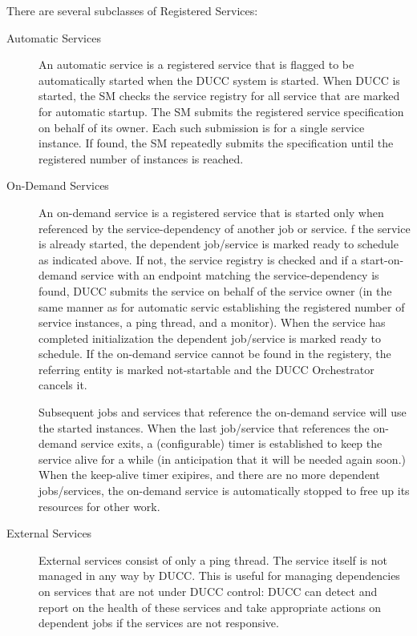       There are several subclasses of Registered Services:
      \begin{description}

        \item[Automatic Services] An automatic service is a registered service that is flagged to be
          automatically started when the DUCC system is started. When DUCC is started, the SM checks the
          service registry for all service that are marked for automatic startup. The SM submits the
          registered service specification on behalf of its owner. Each such submission is for a single
          service instance.  If found, the SM repeatedly submits the specification until the registered
          number of instances is reached.
          
        \item[On-Demand Services] An on-demand service is a registered service that is started only when
          referenced by the service-dependency of another job or service. f the service is already
          started, the dependent job/service is marked ready to schedule as indicated above. If not, the
          service registry is checked and if a start-on-demand service with an endpoint matching the
          service-dependency is found, DUCC submits the service on behalf of the service owner (in the
          same manner as for automatic servic establishing the registered number of service instances, a
          ping thread, and a monitor). When the service has completed initialization the dependent
          job/service is marked ready to schedule. If the on-demand service cannot be found in the
          registery, the referring entity is marked not-startable and the DUCC Orchestrator cancels it.
          
          Subsequent jobs and services that reference the on-demand service will use the started
          instances.  When the last job/service that references the on-demand service exits, a
          (configurable) timer is established to keep the service alive for a while (in anticipation that
          it will be needed again soon.)  When the keep-alive timer exipires, and there are no more
          dependent jobs/services, the on-demand service is automatically stopped to free up its resources
          for other work.

          \item[External Services] External services consist of only a ping thread.  The service
            itself is not managed in any way by DUCC.  This is useful for managing dependencies
            on services that are not under DUCC control: DUCC can detect and report on the health
            of these services and take appropriate actions on dependent jobs if the services
            are not responsive.
      \end{description}
          
